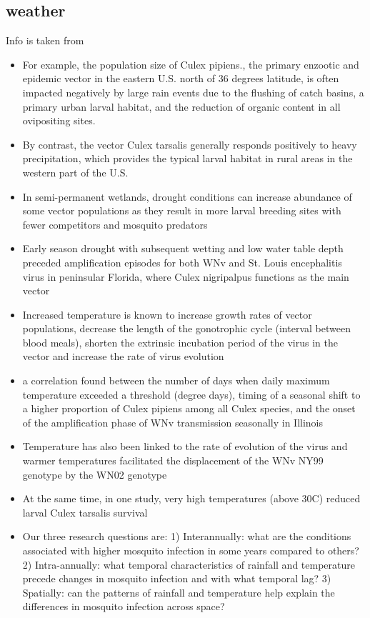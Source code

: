 \documentclass[a4, 12pt]{article}
\begin{document}
\subsection{weather}
Info is taken from \citet{ruiz2010local}
\begin{itemize}
\item  For example, the population size of Culex pipiens., the primary enzootic and epidemic vector in the eastern U.S. north of 36 degrees latitude, is often impacted negatively by large rain events due to the flushing of catch basins, a primary urban larval habitat, and the reduction of organic content in all ovipositing sites.
\item By contrast, the vector Culex tarsalis generally responds positively to heavy precipitation, which provides the typical larval habitat in rural areas in the western part of the U.S.
\item In semi-permanent wetlands, drought conditions can increase abundance of some vector populations as they result in more larval breeding sites with fewer competitors and mosquito predators
\item Early season drought with subsequent wetting and low water table depth preceded amplification episodes for both WNv and St. Louis encephalitis virus in peninsular Florida, where Culex nigripalpus functions as the main vector
\item Increased temperature is known to increase growth rates of vector populations, decrease the length of the gonotrophic cycle (interval between blood meals), shorten the extrinsic incubation period of the virus in the vector and increase the rate of virus evolution
\item a correlation found between the number of days when daily maximum temperature exceeded a threshold (degree days), timing of a seasonal shift to a higher proportion of Culex pipiens among all Culex species, and the onset of the amplification phase of WNv transmission seasonally in Illinois
\item Temperature has also been linked to the rate of evolution of the virus and warmer temperatures facilitated the displacement of the WNv NY99 genotype by the WN02 genotype
\item At the same time, in one study, very high temperatures (above 30\degree C) reduced larval Culex tarsalis survival
\item Our three research questions are: 1) Interannually: what are the conditions associated with higher mosquito infection in some years compared to others? 2) Intra-annually: what temporal characteristics of rainfall and temperature precede changes in mosquito infection and with what temporal lag? 3) Spatially: can the patterns of rainfall and temperature help explain the differences in mosquito infection across space?

\end{itemize}
\end{document}
